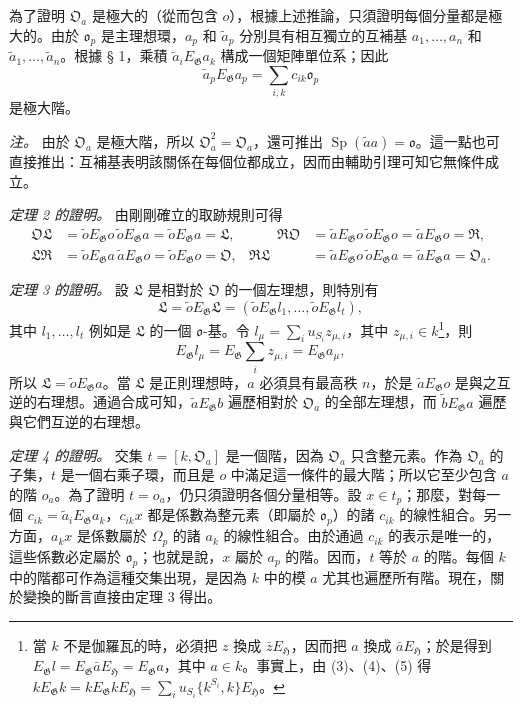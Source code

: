 \documentclass[11pt]{article}
\providecommand{\Gg}{\mathfrak G}
\providecommand{\Hh}{\mathfrak H}
\providecommand{\oo}{\mathfrak o}
\providecommand{\Sp}{\operatorname{Sp}}
\begin{document}
為了證明 \(\mathfrak O_a\) 是極大的（從而包含 \(o\)），根據上述推論，只須證明每個分量都是極大的。由於 \(\oo_p\) 是主理想環，\(a_p\) 和 \(\widetilde a_p\) 分別具有相互獨立的互補基 \(a_1,\ldots,a_n\) 和 \(\widetilde a_1,\ldots,\widetilde a_n\)。根據 § 1，乘積 \(\widetilde a_iE_\Gg a_k\) 構成一個矩陣單位系；因此
\[
\widetilde a_pE_\Gg a_p=\sum_{i,k}c_{ik}\oo_p
\]
是極大階。

\emph{注。} 由於 \(\mathfrak O_a\) 是極大階，所以 \(\mathfrak O_a^2=\mathfrak O_a\)，還可推出 \(\Sp(\widetilde a a)=\oo\)。這一點也可直接推出：互補基表明該關係在每個位都成立，因而由輔助引理可知它無條件成立。

\medskip
\noindent\emph{定理 2 的證明。} 由剛剛確立的取跡規則可得
\[
\begin{aligned}
\mathfrak O\mathfrak L
 &=\widetilde oE_\Gg o\,\widetilde oE_\Gg a
 =\widetilde oE_\Gg a=\mathfrak L,
&\qquad
\mathfrak R\mathfrak O
 &=\widetilde aE_\Gg o\,\widetilde oE_\Gg o
 =\widetilde aE_\Gg o=\mathfrak R,\\
\mathfrak L\mathfrak R
 &=\widetilde oE_\Gg a\,\widetilde aE_\Gg o
 =\widetilde oE_\Gg o=\mathfrak O,
&
\mathfrak R\mathfrak L
 &=\widetilde aE_\Gg o\,\widetilde oE_\Gg a
 =\widetilde aE_\Gg a=\mathfrak O_a.
\end{aligned}
\]

\medskip
\noindent\emph{定理 3 的證明。} 設 \(\mathfrak L\) 是相對於 \(\mathfrak O\) 的一個左理想，則特別有
\[
\mathfrak L=\widetilde oE_\Gg\mathfrak L
 =(\widetilde oE_\Gg l_1,\ldots,\widetilde oE_\Gg l_t),
\]
其中 \(l_1,\ldots,l_t\) 例如是 \(\mathfrak L\) 的一個 \(\oo\)-基。令 \(l_\mu=\sum_i u_{S_i}z_{\mu,i}\)，其中 \(z_{\mu,i}\in k\)\footnote{當 \(k\) 不是伽羅瓦的時，必須把 \(z\) 換成 \(\bar zE_\Hh\)，因而把 \(a\) 換成 \(\bar aE_\Hh\)；於是得到 \(E_\Gg l=E_\Gg\bar aE_\Hh=E_\Gg a\)，其中 \(a\in k\)。事實上，由 (3)、(4)、(5) 得 \(kE_\Gg k=kE_\Gg kE_\Hh=\sum_i u_{S_i}\{k^{S_i},k\}E_\Hh\)。}，則
\[
E_\Gg l_\mu=E_\Gg\sum_i z_{\mu,i}=E_\Gg a_\mu,
\]
所以 \(\mathfrak L=\widetilde oE_\Gg a\)。當 \(\mathfrak L\) 是正則理想時，\(a\) 必須具有最高秩 \(n\)，於是 \(\widetilde aE_\Gg o\) 是與之互逆的右理想。通過合成可知，\(\widetilde aE_\Gg b\) 遍歷相對於 \(\mathfrak O_a\) 的全部左理想，而 \(\widetilde bE_\Gg a\) 遍歷與它們互逆的右理想。

\medskip
\noindent\emph{定理 4 的證明。} 交集 \(t=[k,\mathfrak O_a]\) 是一個階，因為 \(\mathfrak O_a\) 只含整元素。作為 \(\mathfrak O_a\) 的子集，\(t\) 是一個右乘子環，而且是 \(o\) 中滿足這一條件的最大階；所以它至少包含 \(a\) 的階 \(o_a\)。為了證明 \(t=o_a\)，仍只須證明各個分量相等。設 \(x\in t_p\)；那麼，對每一個 \(c_{ik}=\widetilde a_iE_\Gg a_k\)，\(c_{ik}x\) 都是係數為整元素（即屬於 \(\oo_p\)）的諸 \(c_{ik}\) 的線性組合。另一方面，\(a_kx\) 是係數屬於 \(\Omega_p\) 的諸 \(a_k\) 的線性組合。由於通過 \(c_{ik}\) 的表示是唯一的，這些係數必定屬於 \(\oo_p\)；也就是說，\(x\) 屬於 \(a_p\) 的階。因而，\(t\) 等於 \(a\) 的階。每個 \(k\) 中的階都可作為這種交集出現，是因為 \(k\) 中的模 \(a\) 尤其也遍歷所有階。現在，關於變換的斷言直接由定理 3 得出。
\end{document}
